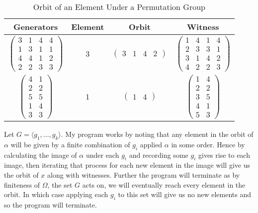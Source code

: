 \documentclass{article}
\begin{document}
\begin{table}[hp]
\begin{center}
\begin{tabular}{|c|ccc|}
\hline
Generators & Element & Orbit & Witness \\ \hline
$ \begin{pmatrix}
 3  &   1  &  4  &  4  \\
 1  &   3  &  1  &  1   \\
 4  &   4  &  1  &  2   \\
 2  &   2  &  3  &  3  
 \end{pmatrix} $     & 3      & $\begin{pmatrix}  3   & 1   &   4    &  2 
\end{pmatrix}$    &  $ \begin{pmatrix}
     1  &  4  &  1  &  4\\
     2  &  3  &  3  &  1\\
     3  &  1  &  4  &  2\\
     4  &  2  &  2  &  3
 \end{pmatrix}$  \\
$\begin{pmatrix}
     4  &  1\\
     2  &  2\\
     5  &  5\\
     1  &  4\\
     3  &  3 
\end{pmatrix}$      & $1$      & $\begin{pmatrix} 1 & 4\end{pmatrix}$  & $\begin{pmatrix}
     1  &  4\\
     2  &  2\\
     3  &  5\\
     4  &  1\\
     5  &  3 
\end{pmatrix}$ \\ \hline
\end{tabular}
\caption{Orbit of an Element Under a Permutation Group}
\end{center}
\end{table}



Let $G=\langle g_1, \ldots ,g_k\rangle$.  My program works by noting that any element in the orbit of $\alpha$ will be given by a finite combination of $g_i$ applied $\alpha$ in some order.  Hence by calculating the image of $\alpha$ under each $g_i$ and recording some $g_i$ gives rise to each image, then iterating that process for each new element in the image will give us the orbit of $x$ along with witnesses. Further the program will terminate as by finiteness of $\Omega$,  the set $G$ acts on,  we will eventually reach every element in the orbit.  In which case applying each $g_i$ to this set will give us no new elements and so the program will terminate. 
\end{document}
